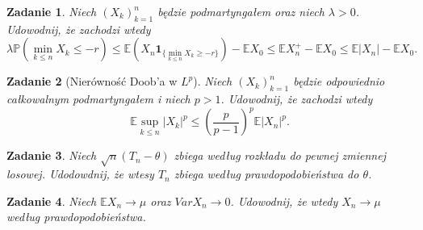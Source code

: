 \documentclass{mwart}
\newtheorem{zd}{Zadanie}
\begin{document}
\begin{zd}
Niech $(X_k)_{k=1}^n$ będzie podmartyngałem oraz niech $\lambda > 0$. Udowodnij, że zachodzi wtedy
\begin{displaymath}
\lambda \mathbb{P}(\min_{k\leq n}X_k \leq -r) \leq \mathbb{E}(X_n\pmb{1}_{\{\min_{k\leq n}X_k \geq -r\}}) - \mathbb{E}X_0 \leq \mathbb{E}X_n^+ - \mathbb{E}X_0 \leq \mathbb{E}|X_n| - \mathbb{E}X_0.
\end{displaymath}
\end{zd}

\begin{zd}[Nierówność Doob'a w $L^p$]
Niech $(X_k)_{k=1}^n$ będzie odpowiednio całkowalnym podmartyngałem i niech $p > 1$. Udowodnij, że zachodzi wtedy
\begin{displaymath}
\mathbb{E}\sup_{k\leq n}|X_k|^p \leq \left(\frac{p}{p-1}\right)^p\mathbb{E}|X_n|^p.
\end{displaymath}
\end{zd}


\begin{zd}
Niech $\sqrt{n}(T_n - \theta)$ zbiega według rozkładu do pewnej zmiennej losowej. Udodowdnij, że wtesy $T_n$ zbiega według prawdopodobieństwa do $\theta$.
\end{zd}

\begin{zd}
Niech $\mathbb{E}X_n \to \mu$ oraz $VarX_n \to 0$. Udowodnij, że wtedy $X_n \to \mu$ według prawdopodobieństwa.
\end{zd}
\end{document}

